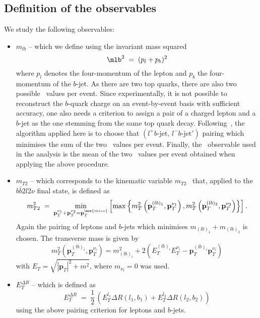 
\subsection{Definition of the observables}

We study the following observables:
\begin{itemize}

\item $m_{lb}$ -- which we define using the invariant mass squared
  \begin{equation}\label{def:mlb}
    \mlb^2\;=\;(p_l+p_b)^2
  \end{equation}
  where $p_l$ denotes the four-momentum of the lepton and $p_b$ the
  four-momentum of the $b$-jet. As there are two top quarks, there are also
 two possible \mlb\ values per event. Since experimentally, it is not possible to reconstruct
 the $b$-quark charge on an event-by-event basis with sufficient accuracy, one also needs a
 criterion to assign a pair of a charged lepton and a $b$-jet
 as the one stemming from the same top quark decay.
Following~\cite{Aaboud:2016igd}, the algorithm applied here is to choose
that $(l^+b\text{-jet},\,l^-b\text{-jet}')$ pairing which
 minimises the sum of the two \mlb\ values per event.
 Finally, the \mlb\ observable used in the analysis is the mean of the two \mlb\
 values per event obtained when applying the above procedure.

\item $m_{T2}$ -- which corresponds to the kinematic variable
  $m_{T2}$~\cite{Lester:1999tx,Barr:2003rg} that, applied to the
  $b\bar{b} 2l 2\nu$ final state, is defined as
  \begin{equation}\label{def:MT2}
    m_{T2}^2\;=\;\min_{\mathbf{p}_T^{\nu_1}+\mathbf{p}_T^{\nu_2}=\mathbf{p}_T^{\mrm{miss}}} \left[ \max \left\{ m_{T}^2 \left( \mathbf{p}_T^{(lb)_1}, \mathbf{p}_T^{\nu_1} \right), m_{T}^2 \left( \mathbf{p}_T^{(lb)_2}, \mathbf{p}_T^{\nu_2} \right) \right\}  \right].
  \end{equation}
Again the pairing of leptons and $b$-jets which minimises
$m_{(lb)_1}+m_{(lb)_2}$ is chosen.
The transverse mass is given by
\begin{equation}
m_T^2\left(\mathbf{p}_T^{(lb)_i}, \mathbf{p}_T^{\nu_i}\right) = m_{(lb)_i}^2 + 2 \left( E_T^{(lb)_i} E_T^{\nu_i} - \mathbf{p}_T^{(lb)_i} \mathbf{p}_T^{\nu_i} \right)\nonumber
\end{equation}
with $E_T = \sqrt{|\mathbf{p}_T|^2+m^2}$, where $m_{\nu_i} = 0$ was used.

\item $E_T^{\Delta R}$ -- which is defined as
  \begin{equation}\label{def:ETdR}
    E_T^{\Delta R}\;=\;\frac{1}{2}\,\left(E_T^{l_1}\Delta R(l_1,b_1)+E_T^{l_2}\Delta R(l_2,b_2)\right)
  \end{equation}
  using the above pairing criterion for leptons and $b$-jets.
  
\end{itemize}

